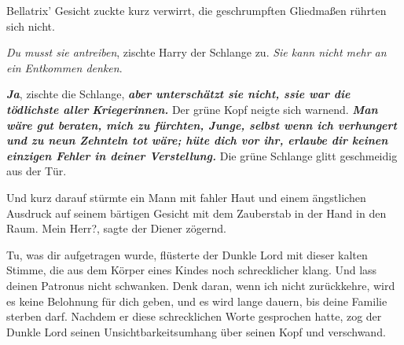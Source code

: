 Bellatrix' Gesicht zuckte kurz verwirrt, die geschrumpften Gliedmaßen rührten
sich nicht.

\glqq{}\emph{Du musst sie antreiben}\grqq{}, zischte Harry der Schlange zu. \glqq{}
\emph{Sie kann nicht mehr an ein Entkommen denken}.\grqq{}

\glqq{}\textbf{\emph{Ja}}\grqq{}, zischte die Schlange, \glqq{}\textbf{\emph{aber
unterschätzt sie nicht, ssie war die tödlichste aller
}}\textbf{\emph{Kriegerinnen.}}\grqq{} Der grüne Kopf neigte sich warnend. \glqq{}
\textbf{\emph{Man wäre gut beraten, mich zu fürchten, Junge, selbst wenn ich
verhungert und zu neun Zehnteln tot wäre; hüte dich vor ihr, erlaube dir keinen
einzigen Fehler in deiner Verstellung.}}\grqq{} Die grüne Schlange glitt geschmeidig
aus der Tür.

Und kurz darauf stürmte ein Mann mit fahler Haut und einem ängstlichen Ausdruck
auf seinem bärtigen Gesicht mit dem Zauberstab in der Hand in den Raum. \glqq{}
Mein Herr?\grqq{}, sagte der Diener zögernd.

\glqq{}Tu, was dir aufgetragen wurde\grqq{}, flüsterte der Dunkle Lord mit dieser
kalten Stimme, die aus dem Körper eines Kindes noch schrecklicher klang. \glqq{}
Und lass deinen Patronus nicht schwanken. Denk daran, wenn ich nicht
zurückkehre, wird es keine Belohnung für dich geben, und es wird lange dauern,
bis deine Familie sterben darf.\grqq{} Nachdem er diese schrecklichen Worte gesprochen
hatte, zog der Dunkle Lord seinen Unsichtbarkeitsumhang über seinen Kopf und
verschwand.

